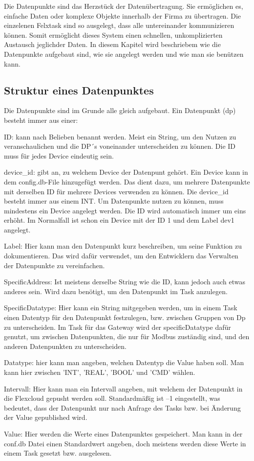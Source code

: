 Die Datenpunkte sind das Herzstück der Datenübertragung. Sie ermöglichen es, einfache Daten oder komplexe Objekte innerhalb der Firma zu übertragen. Die einzelenen Felxtask sind so ausgelegt, dass alle untereinander kommunizieren können. Somit ermöglicht dieses System einen schnellen, unkomplizierten Austausch jeglichder Daten. In diesem Kapitel wird beschriebem wie die Datenpunkte aufgebaut sind, wie sie angelegt werden und wie man sie benützen kann.

\subsection{Struktur eines Datenpunktes}\label{Datenpunkte} 

Die Datenpunkte sind im Grunde alle gleich aufgebaut. Ein Datenpunkt (dp) besteht immer aus einer:

\begin{compactitem}
    \item ID: kann nach Belieben benannt werden. Meist ein String, um den Nutzen zu veranschaulichen und die DP´s voneinander unterscheiden zu können. Die ID muss für jedes Device eindeutig sein.
    \item device\_id: gibt an, zu welchem Device der Datenpunt gehört. Ein Device kann in dem config.db-File hinzugefügt werden. Das dient dazu, um mehrere Datenpunkte mit derselben ID für mehrere Devices verwenden zu können. Die device\_id besteht immer aus einem INT. Um Datenpunkte nutzen zu können, muss mindestens ein Device angelegt werden. Die ID wird automatisch immer um eins erhöht. Im Normalfall ist schon ein Device mit der ID 1 und dem Label dev1 angelegt.
    \item Label: Hier kann man den Datenpunkt kurz beschreiben, um seine Funktion zu dokumentieren. Das wird dafür verwendet, um den Entwicklern das Verwalten der Datenpunkte zu vereinfachen.
    \item SpecificAddress: Ist meistens derselbe String wie die ID, kann jedoch auch etwas anderes sein. Wird dazu benötigt, um den Datenpunkt im Task anzulegen.
    \item SpecificDatatype: Hier kann ein String mitgegeben werden, um in einem Task einen Datentyp für den Datenpunkt festzulegen, bzw. zwischen Gruppen von Dp zu unterscheiden. Im Task für das Gateway wird der specificDatatype dafür genutzt, um zwischen Datenpunkten, die nur für Modbus zuständig sind, und den anderen Datenpunkten zu unterscheiden.
    \item Datatype: hier kann man angeben, welchen Datentyp die Value haben soll. Man kann hier zwischen 'INT', 'REAL', 'BOOL' und 'CMD' wählen.
    \item Intervall: Hier kann man ein Intervall angeben, mit welchem der Datenpunkt in die Flexcloud gepusht werden soll. Standardmäßig ist –1 eingestellt, was bedeutet, dass der Datenpunkt nur nach Anfrage des Tasks bzw. bei Änderung der Value gepublished wird.
    \item Value: Hier werden die Werte eines Datenpunktes gespeichert. Man kann in der conf.db Datei einen Standardwert angeben, doch meistens werden diese Werte in einem Task gesetzt bzw. ausgelesen.
\end{compactitem}

